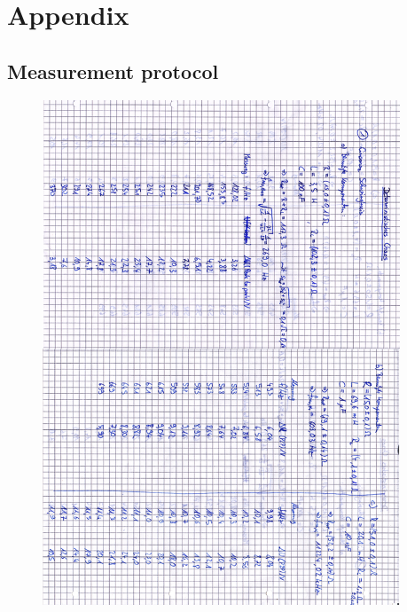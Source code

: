 \clearpage
\section{Appendix}
\begin{appendix}
\section{Measurement protocol}

\begin{figure}[H]
\centering \includegraphics[width=0.95\textwidth]{Bilder/anh1.png}
\end{figure}


\end{appendix}
